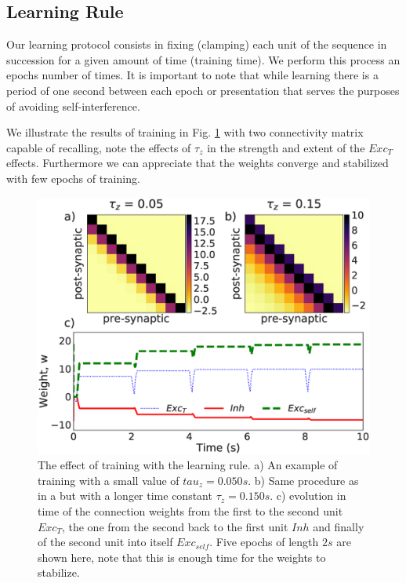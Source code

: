 \documentclass[a4paper]{esannV2}
\begin{document}
\subsection{Learning Rule}
Our learning protocol consists in fixing (clamping) each unit of the sequence in succession for a given amount of time (training time). We perform this process an epochs number of times. It is important to note that while learning there is a period of one second between each epoch or presentation that serves the purposes of avoiding self-interference.  

We illustrate the results of training in Fig. \ref{Fig:epochs} with two connectivity matrix capable of recalling, note the effects of $\tau_z$ in the strength and extent of the $Exc_T$ effects. Furthermore we can appreciate that the weights converge and stabilized with few epochs of training. 


\begin{figure}[H]
\centering
\includegraphics[scale=0.25]{training_rule.eps}
\caption{The effect of training with the learning rule. a) An example of training with a small value of $tau_z=0.050s$. b) Same procedure as in a but with a longer time constant $\tau_z=0.150s$. c) evolution in time of the connection weights from the first to the second unit $Exc_T$, the one from the second back to the first unit $Inh$ and finally of the second unit into itself $Exc_{self}$. Five epochs of length $2s$ are shown here, note that this is enough time for the weights to stabilize.}\label{Fig:epochs}
\end{figure}
\end{document}
